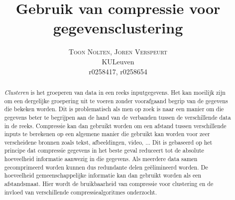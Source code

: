 \documentclass[twoside]{article}
\title{\vspace{-15mm}\fontsize{24pt}{10pt}\selectfont\textbf{Gebruik van compressie voor gegevensclustering}} %
\author{
\large
\textsc{Toon Nolten, Joren Verspeurt} \\%
\normalsize KULeuven \\ %
\normalsize r0258417, r0258654
\vspace{-5mm}
}
\date{}
\begin{document}
\maketitle %



\begin{abstract}

\emph{Clusteren} is het groeperen van data in een reeks inputgegevens. 
Het kan moeilijk zijn om een dergelijke groepering uit te voeren zonder voorafgaand begrip
van de gegevens die bekeken worden. 
Dit is problematisch als men op zoek is naar een manier om die gegevens beter te begrijpen 
aan de hand van de verbanden tussen de verschillende data in de reeks.
Compressie kan dan gebruikt worden om een afstand tussen verschillende inputs te berekenen
op een algemene manier die gebruikt kan worden voor zeer verscheidene bronnen zoals tekst,
afbeeldingen, video, ...
Dit is gebaseerd op het principe dat compressie gegevens in het beste geval reduceert tot 
de absolute hoeveelheid informatie aanwezig in die gegevens.
Als meerdere data samen gecomprimeerd worden kunnen dus redundante delen ge\"elimineerd 
worden. 
De hoeveelheid gemeenschappelijke informatie kan dan gebruikt worden als een afstandsmaat.
Hier wordt de bruikbaarheid van compressie voor clustering en de invloed van verschillende 
compressiealgoritmes onderzocht.

\end{abstract}

\end{document}
